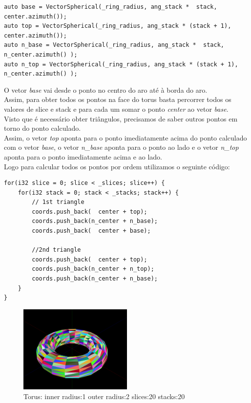 \documentclass[a4paper]{report}
\begin{document}
\begin{lstlisting}
auto base = VectorSpherical(_ring_radius, ang_stack *  stack, center.azimuth());
auto top = VectorSpherical(_ring_radius, ang_stack * (stack + 1), center.azimuth());
auto n_base = VectorSpherical(_ring_radius, ang_stack *  stack, n_center.azimuth() );
auto n_top = VectorSpherical(_ring_radius, ang_stack * (stack + 1), n_center.azimuth() );
\end{lstlisting}
O vetor \textit{base} vai desde o ponto no centro do aro até à borda do aro.\\
Assim, para obter todos os pontos na face do torus basta percorrer todos os
valores de slice e stack e para cada um somar o ponto \textit{center} ao vetor
\textit{base}.\\
Visto que é necessário obter triângulos, precisamos de saber outros pontos em
torno do ponto calculado.\\
Assim, o vetor \textit{top} aponta para o ponto imediatamente acima do ponto
calculado com o vetor \textit{base}, o vetor \textit{n\_base} aponta para o
ponto ao lado e o vetor \textit{n\_top} aponta para o ponto imediatamente acima
e ao lado.\\
Logo para calcular todos os pontos por ordem utilizamos o seguinte código:

\begin{lstlisting}
for(i32 slice = 0; slice < _slices; slice++) {
    for(i32 stack = 0; stack < _stacks; stack++) {
        // 1st triangle
        coords.push_back(  center + top);
        coords.push_back(n_center + n_base);
        coords.push_back(  center + base);

        //2nd triangle
        coords.push_back(  center + top);
        coords.push_back(n_center + n_top);
        coords.push_back(n_center + n_base);
    }
}
\end{lstlisting}

\begin{figure}[H]
    \centering 
    \includegraphics[width=0.5\textwidth]{images/torus.png}  
    \caption{Torus: inner radius:1 outer radius:2 slices:20 stacks:20}
    \label{fig:torus_render}
\end{figure}
\end{document}
